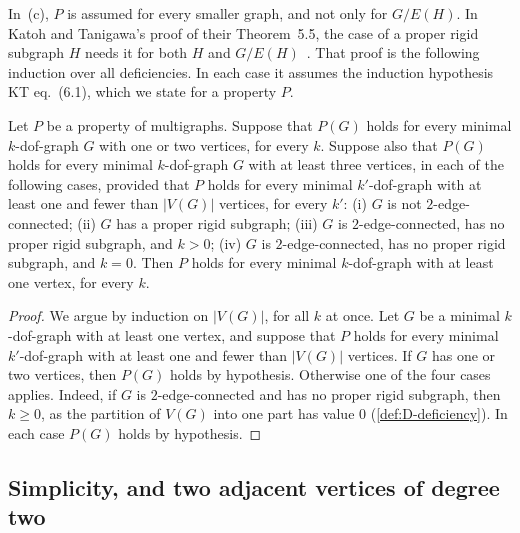 In~(c), $P$ is assumed for every smaller graph, and not only for
$G/E(H)$. In Katoh and Tanigawa's proof of their Theorem~5.5, the case of
a proper rigid subgraph $H$ needs it for both $H$ and
$G/E(H)$~\cite[p.~673]{katohTanigawa2011}. That proof is the following
induction over all deficiencies. In each case it assumes the induction
hypothesis KT eq.~(6.1), which we state for a property $P$.

\begin{theorem}
  \label{thm:minimal-kdof-reduction-all-k}
  \leanok
  Let $P$ be a property of multigraphs. Suppose that $P(G)$ holds for
  every minimal $k$-dof-graph $G$ with one or two vertices, for every
  $k$. Suppose also that $P(G)$ holds for every minimal $k$-dof-graph
  $G$ with at least three vertices, in each of the following cases,
  provided that $P$ holds for every minimal $k'$-dof-graph with at least
  one and fewer than $|V(G)|$ vertices, for every $k'$: \textup{(i)} $G$
  is not $2$-edge-connected; \textup{(ii)} $G$ has a proper rigid
  subgraph; \textup{(iii)} $G$ is $2$-edge-connected, has no proper rigid
  subgraph, and $k > 0$; \textup{(iv)} $G$ is $2$-edge-connected, has no
  proper rigid subgraph, and $k = 0$. Then $P$ holds for every minimal
  $k$-dof-graph with at least one vertex, for every $k$.
\end{theorem}
\begin{proof}
  \leanok
  We argue by induction on $|V(G)|$, for all $k$ at once. Let $G$ be a
  minimal $k$-dof-graph with at least one vertex, and suppose that $P$
  holds for every minimal $k'$-dof-graph with at least one and fewer than
  $|V(G)|$ vertices. If $G$ has one or two vertices, then $P(G)$ holds by
  hypothesis. Otherwise one of the four cases applies. Indeed, if $G$ is
  $2$-edge-connected and has no proper rigid subgraph, then $k \ge 0$, as
  the partition of $V(G)$ into one part has value $0$
  (\cref{def:D-deficiency}). In each case $P(G)$ holds by hypothesis.
\end{proof}

\subsection{Simplicity, and two adjacent vertices of degree two}
\label{sec:simplicity-and-adjacent-pair}

